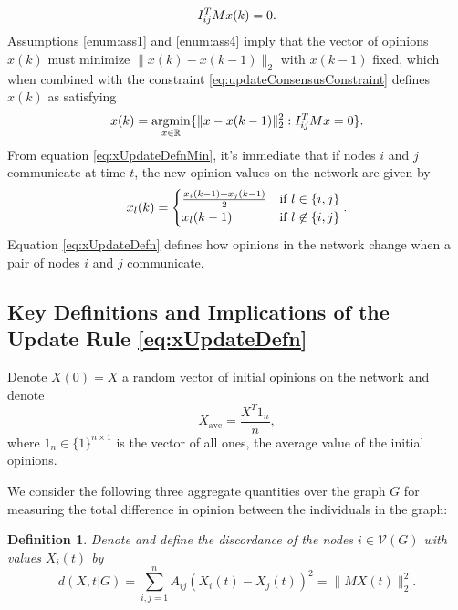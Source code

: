 \documentclass{amsart}
\DeclareMathOperator{\argmin}{argmin}
\newcommand{\R}[0]{\mathbb{R}}
\newtheorem{definition}{Definition}
\theoremstyle{remark}
\begin{document}
\begin{equation}{\label{eq:updateConsensusConstraint}}
	I_{ij}^TMx(k) = 0.
\end{equation}
Assumptions \ref{enum:ass1} and \ref{enum:ass4} imply that the vector of opinions $x(k)$ must minimize $\|x(k)-x(k-1)\|_2$ with $x(k-1)$ fixed, which when combined with the constraint \eqref{eq:updateConsensusConstraint} defines $x(k)$ as satisfying 
\begin{equation}{\label{eq:xUpdateDefnMin}}
	x(k) = \argmin_{x\in\R}\{\|x-x(k-1)\|^2_2 : I_{ij}^TMx=0\}.
\end{equation}
From equation \eqref{eq:xUpdateDefnMin}, it's immediate that if nodes $i$ and $j$ communicate at time $t$, the new opinion values on the network are given by
\begin{equation}{\label{eq:xUpdateDefn}}
	x_l(k) =
	\begin{cases}
		\frac{x_i(k-1)+x_j(k-1)}{2} & \text{if } l\in\{i,j\}\\
		x_l(k-1) & \text{if } l\not\in\{i,j\}
	\end{cases}.
\end{equation}
Equation \eqref{eq:xUpdateDefn} defines how opinions in the network change when a pair of nodes $i$ and $j$ communicate.

\subsection{Key Definitions and Implications of the Update Rule \eqref{eq:xUpdateDefn}}

Denote $X(0)=X$ a random vector of initial opinions on the network and denote
\begin{equation}
	X_{\text{ave}} = \frac{X^T1_n}{n},
\end{equation}
where $1_n\in\{1\}^{n\times1}$ is the vector of all ones, the average value of the initial opinions.

We consider the following three aggregate quantities over the graph $G$ for measuring the total difference in opinion between the individuals in the graph:
\begin{definition}{\label{defn:discordance}}
	Denote and define the \textit{discordance} of the nodes $i\in\mathcal{V}(G)$ with values $X_i(t)$ by 
\begin{equation*}
	d(X,t|G) = \sum_{i,j=1}^nA_{ij}(X_i(t)-X_j(t))^2 = \|MX(t)\|_2^2.
\end{equation*}
\end{definition}
\end{document}
